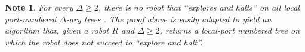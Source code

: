 \documentclass{aamas2015}
\newtheorem{note}{Note}
\def\Bij{\textrm{Bij}(\Delta)}
\newcommand{\sr}[1]{\footnote{{\color{red} Note. #1}}}
\begin{document}

%
%
%
%

\begin{note}
For every $\Delta \geq 2$, there is no robot that ``explores and halts'' on all local port-numbered $\Delta$-ary trees \cite{Diks200438}.
The proof above is easily adapted to yield an algorithm that, given a robot $R$ and $\Delta \geq 2$, returns a local-port numbered tree on which the robot does not succeed to ``explore and halt''.
\end{note}
\end{document}
